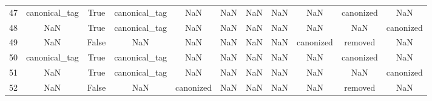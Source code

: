 \begin{table}[h!]
{\begin{tabular}{|c|c|c|c|c|c|c|c|c|c|c|}
         47 &             canonical\_tag &                              True &                canonical\_tag &                                  NaN &                                  NaN &                                  NaN &                                  NaN &                                  NaN &                            canonized &                                                NaN \\
         48 &                       NaN &                              True &                canonical\_tag &                                  NaN &                                  NaN &                                  NaN &                                  NaN &                                  NaN &                                  NaN &                                          canonized \\
         49 &                       NaN &                             False &                          NaN &                                  NaN &                                  NaN &                                  NaN &                                  NaN &                            canonized &                              removed &                                                NaN \\
         50 &             canonical\_tag &                              True &                canonical\_tag &                                  NaN &                                  NaN &                                  NaN &                                  NaN &                                  NaN &                            canonized &                                                NaN \\
         51 &                       NaN &                              True &                canonical\_tag &                                  NaN &                                  NaN &                                  NaN &                                  NaN &                                  NaN &                                  NaN &                                          canonized \\
         52 &                       NaN &                             False &                          NaN &                            canonized &                                  NaN &                                  NaN &                                  NaN &                                  NaN &                              removed &                                                NaN \\

\end{tabular}}
\end{table}
